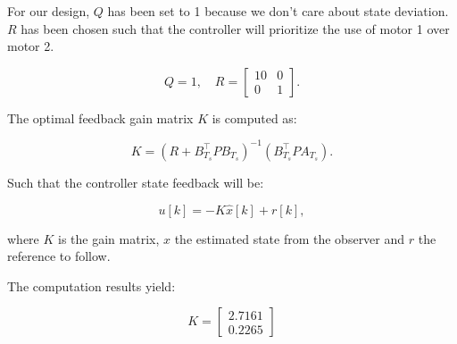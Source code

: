 For our design, $Q$ has been set to 1 because we don't care about state deviation. $R$ has been chosen such that the 
controller will prioritize the use of motor 1 over motor 2. 

\[
Q = 1, \quad
R = \begin{bmatrix}
10 & 0 \\
0 & 1
\end{bmatrix}.
\]

The optimal feedback gain matrix \( K \) is computed as:

\[
K = \left( R + B_{T_s}^\top P B_{T_s} \right)^{-1} \left(B_{T_s}^\top P A_{T_s} \right).
\]

Such that the controller state feedback will be:

\[
u[k] = -K \hat{x}[k] + r[k],
\]

where \( K \) is the gain matrix, $\hat{x}$ the estimated state from the observer and $r$ the reference to follow.

The computation results yield:

\[
K = \begin{bmatrix}
    2.7161 \\ 0.2265
\end{bmatrix}
\]
